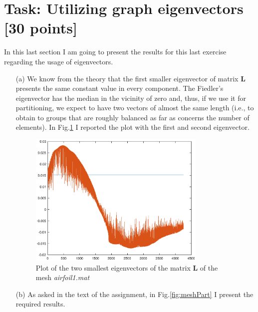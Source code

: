 \documentclass[unicode,11pt,a4paper,oneside,numbers=endperiod,openany]{scrartcl}
\begin{document}
\section{Task: Utilizing graph eigenvectors [30 points]}
In this last section I am going to present the results for this last exercise regarding the usage of eigenvectors.
\begin{enumerate}
	\item [(a)] We know from the theory that the first smaller eigenvector of  matrix \textbf{L} presents the same constant value in every component. The Fiedler's eigenvector has the median in the vicinity of zero and, thus, if we use it for partitioning, we expect to have two vectors of almost the same length (i.e., to obtain to groups that are roughly balanced as far as concerns the number of elements). In Fig.\ref{fig:lambda12} I reported the plot with the first and second eigenvector. 
	\begin{figure}[h!]
		\centering
		\includegraphics[width=0.8\textwidth]{images/eigval12.eps}
		\caption{Plot of the two smallest eigenvectors of the matrix \textbf{L} of the mesh \textit{airfoil1.mat}}
		\label{fig:lambda12}
	\end{figure}
 
	\item [(b)] As asked in the text of the assignment, in Fig.\ref{fig:meshPart} I present the required results.
	

\end{enumerate}
\end{document}
